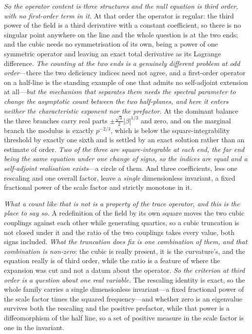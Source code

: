\documentclass[11pt,a4paper]{article}
\theoremstyle{plain}
\theoremstyle{definition}
\theoremstyle{remark}
\begin{document}
\emph{So the operator content is three structures and the null equation is third order, with no first-order term
in it.} At that order the operator is regular: the third power of the field is a third derivative with a
constant coefficient, so there is no singular point anywhere on the line and the whole question is at the two
ends; and the cubic needs no symmetrisation of its own, being a power of one symmetric operator and leaving an
exact total derivative as its Lagrange difference. \emph{The counting at the two ends is a genuinely different
problem at odd order}---there the two deficiency indices need not agree, and a first-order operator on a
half-line is the standing example of one that admits no self-adjoint extension at all---\emph{but the mechanism
that separates them needs the spectral parameter to change the asymptotic count between the two half-planes, and
here it enters neither the characteristic exponent nor the prefactor.} At the dominant balance the three
branches carry real parts $\pm\tfrac{\sqrt3}{2}|\beta|^{1/3}$ and zero, and on the marginal branch the modulus
is exactly $p^{-2/3}$, which is below the square-integrability threshold by exactly one sixth and is settled by
an exact solution rather than an estimate of order. \emph{Two of the three are square-integrable at each end, the
far end being the same equation under one change of signs, so the indices are equal and a self-adjoint
realisation exists}---a circle of them.
And three coefficients, less one rescaling and one overall factor, leave a \emph{single} dimensionless invariant,
a fixed fractional power of the scale factor and strictly monotone in it.

\emph{What a count like that is not is a property of the trace operator, and this is the place to say so.} A
redefinition of the field by its own square moves the two cubic couplings against each other while generating
quartics, so a cubic truncation is not closed under it and the ratio of the two couplings takes every value,
both signs included. \emph{What the truncation does fix is one combination of them, and that combination is
non-zero}: the cubic is really present, it is the curvature's, and the equation really is of third order, while
the ratio is a feature of where the expansion was cut and not a datum about the operator. \emph{So the criterion
at third order is a question about one real variable.} The rescaling identity is exact, so the whole family
carries a single dimensionless invariant---a fixed fractional power of the scale factor times the squared
frequency---and whether zero is an eigenvalue survives both the rescaling and the positive prefactor, while
that power is a diffeomorphism of the half line, so a set of positive measure in the scale factor is one in
the invariant.
\end{document}
